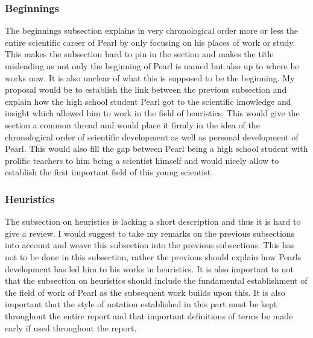 \documentclass{article}
\begin{document}
\subsubsection{Beginnings}
The beginnings subsection explains in very chronological order more or less the entire scientific career of Pearl by only focusing on his places of work or study. This makes the subsection hard to pin in the section and makes the title misleading as not only the beginning of Pearl is named but also up to where he works now. It is also unclear of what this is supposed to be the beginning. My proposal would be to establish the link between the previous subsection and explain how the high school student Pearl got to the scientific knowledge and insight which allowed him to work in the field of heuristics. This would give the section a common thread and would place it firmly in the idea of the chronological order of scientific development as well as personal development of Pearl. This would also fill the gap between Pearl being a high school student with prolific teachers to him being a scientist himself and would nicely allow to establish the first important field of this young scientist.

\subsubsection{Heuristics}
The subsection on heuristics is lacking a short description and thus it is hard to give a review. I would suggest to take my remarks on the previous subsections into account and weave this subsection into the previous subsections. This has not to be done in this subsection, rather the previous should explain how Pearls development has led him to his works in heuristics. 
It is also important to not that the subsection on heuristics should include the fundamental establishment of the field of work of Pearl as the subsequent work builds upon this. It is also important that the style of notation established in this part must be kept throughout the entire report and that important definitions of terms be made early if used throughout the report.
\end{document}
